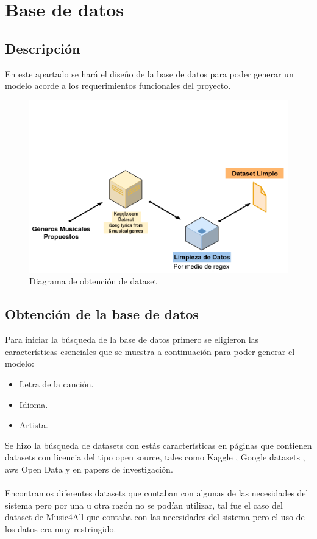 \documentclass[12pt, a4paper, titlepage]{report}
\begin{document}
\section{Base de datos} %
		\subsection{Descripción}
		En este apartado se hará el diseño de la base de datos para poder generar un modelo acorde a los requerimientos funcionales del proyecto.
		
		\begin{figure}[H] 
			\includegraphics[scale=.4]{./imagenes/Disenio/Arquitectura/Dataset_cleaned.png}
			\caption{Diagrama de obtención de dataset}
		\end{figure}
		
		\subsection{Obtención de la base de datos}
		Para iniciar la búsqueda de la base de datos primero se eligieron las características esenciales que se muestra a continuación para poder generar el modelo:
		
		\begin{itemize}
		\item Letra de la canción.
		\item Idioma.
		\item Artista.
		\end{itemize}
		
		Se hizo la búsqueda de datasets con estás características en páginas que contienen datasets con licencia del tipo open source, tales como Kaggle \cite{kaggle}, Google datasets \cite{googleDatasets}, \acrshort{aws} Open Data \cite{awsOpenData} y en papers de investigación.\\\\
		Encontramos diferentes datasets que contaban con algunas de las necesidades del sistema pero por una u otra razón no se podían utilizar, tal fue el caso del dataset de Music4All \cite{music4all} que contaba con las necesidades del sistema pero el uso de los datos era muy restringido.\\
\end{document}
